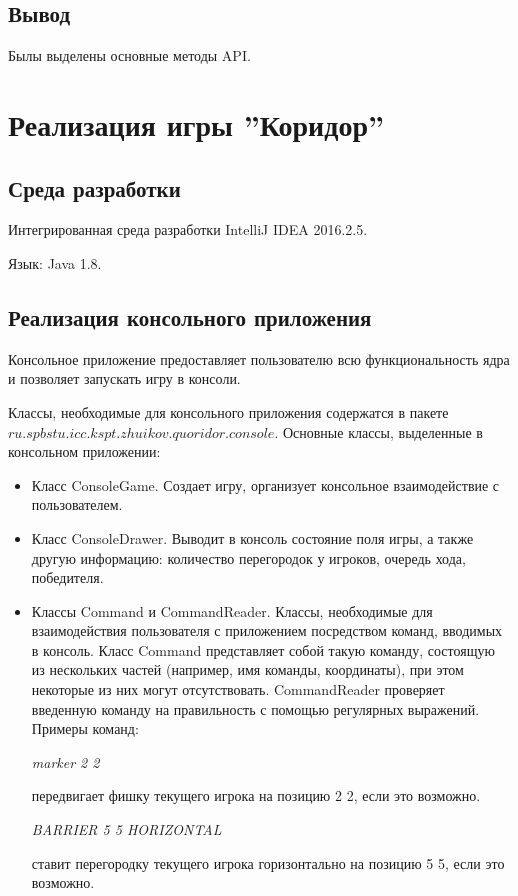 \documentclass[a4paper]{article}
\begin{document}
\subsection{Вывод}
Былы выделены основные методы API.

\section{Реализация игры ''Коридор''}
\subsection{Среда разработки}

\noindent Интегрированная среда разработки IntelliJ IDEA 2016.2.5. 

\noindent Язык: Java 1.8.

\subsection{Реализация консольного приложения}
Консольное приложение предоставляет пользователю всю функциональность ядра и позволяет запускать игру в консоли. 

\noindent Классы, необходимые для консольного приложения содержатся в пакете $ ru.spbstu.icc.kspt.zhuikov.quoridor.console$. 
Основные классы, выделенные в консольном приложении:
\begin{itemize}
\item Класс ConsoleGame. Создает игру, организует консольное взаимодействие с пользователем. 
\item Класс ConsoleDrawer. Выводит в консоль состояние поля игры, а также другую информацию: количество перегородок у игроков, очередь хода, победителя.
\item Классы Command и CommandReader. Классы, необходимые для взаимодействия пользователя с приложением посредством команд, вводимых в консоль. Класс Command представляет собой такую команду, состоящую из нескольких частей (например, имя команды, координаты), при этом некоторые из них могут отсутствовать. CommandReader проверяет введенную команду на правильность с помощью регулярных выражений. Примеры команд:
\begin{center}
\textit{marker 2 2} 
\end{center} передвигает фишку текущего игрока на позицию 2 2, если это возможно. 
\begin{center}
\textit{BARRIER 5 5 HORIZONTAL} 
\end{center} 
ставит перегородку текущего игрока горизонтально на позицию 5 5, если это возможно. 
\end{itemize}
\end{document}
